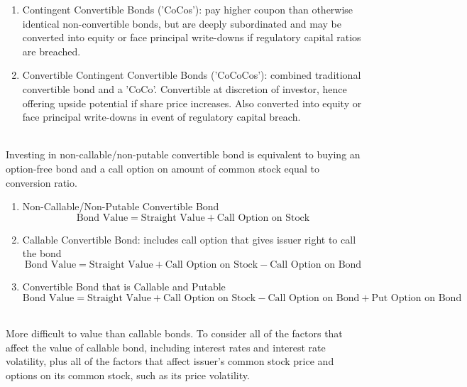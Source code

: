 \begin{remark} 
\begin{enumerate}[label=\roman*.]
\setlength{\itemsep}{0pt}
\item Contingent Convertible Bonds ('CoCos'): pay higher coupon than otherwise identical non-convertible bonds, but are deeply subordinated and may be converted into equity or face principal write-downs if regulatory capital ratios are breached.
\item Convertible Contingent Convertible Bonds ('CoCoCos'): combined traditional convertible bond and a 'CoCo'. Convertible at discretion of investor, hence offering upside potential if share price increases. Also converted into equity or face principal write-downs in event of regulatory capital breach.
\end{enumerate}
\end{remark}

\begin{remark} \\
Investing in non-callable/non-putable convertible bond is equivalent to buying an option-free bond and a call option on amount of common stock equal to conversion ratio.
\begin{enumerate}[label=\roman*.]
\setlength{\itemsep}{0pt}
\item Non-Callable/Non-Putable Convertible Bond
\begin{equation}
\text{Bond Value} = \text{Straight Value} + \text{Call Option on Stock} \nonumber
\end{equation}
\item Callable Convertible Bond: includes call option that gives issuer right to call the bond
\begin{equation}
\text{Bond Value} = \text{Straight Value} + \text{Call Option on Stock} - \text{Call Option on Bond} \nonumber
\end{equation}
\item Convertible Bond that is Callable and Putable
\begin{equation}
\text{Bond Value} = \text{Straight Value} + \text{Call Option on Stock} - \text{Call Option on Bond} + \text{Put Option on Bond} \nonumber
\end{equation}
\end{enumerate}
\end{remark}

\begin{remark} \\
More difficult to value than callable bonds. To consider all of the factors that affect the value of callable bond, including interest rates and interest rate volatility, plus all of the factors that affect issuer’s common stock price and options on its common stock, such as its price volatility.
\end{remark}

